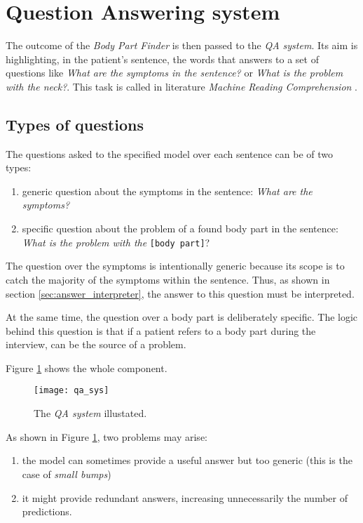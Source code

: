 \section{Question Answering system}
\label{sec:qa_system}
The outcome of the \textit{Body Part Finder} is then passed to the \textit{QA system}. Its aim is highlighting, in the patient's sentence, the words that answers to a set of questions like \textit{What are the symptoms in the sentence?} or \textit{What is the problem with the neck?}. This task is called in literature \textit{Machine Reading Comprehension} \cite{rnet}.

\subsection{Types of questions}
The questions asked to the specified model over each sentence can be of two types:
\begin{enumerate}
  \item generic question about the symptoms in the sentence: \textit{What are the symptoms?}
  \item specific question about the problem of a found body part in the sentence: \textit{What is the problem with the }\texttt{[body part]}?
\end{enumerate}

The question over the symptoms is intentionally generic because its scope is to catch the majority of the symptoms within the sentence. Thus, as shown in section \ref{sec:answer_interpreter}, the answer to this question must be interpreted.

At the same time, the question over a body part is deliberately specific. The logic behind this question is that if a patient refers to a body part during the interview, can be the source of a problem.

Figure \ref{fig:qa} shows the whole component.
\newpage
\begin{figure}[h]
\centering
\texttt{[image: qa\_sys]}
\caption{The \textit{QA system} illustated.}
\medskip
\label{fig:qa}
\end{figure}

As shown in Figure \ref{fig:qa}, two problems may arise: 
\begin{enumerate}
  \item the model can sometimes provide a useful answer but too generic (this is the case of \textit{small bumps})
  \item it might provide redundant answers, increasing unnecessarily the number of predictions.
\end{enumerate}

